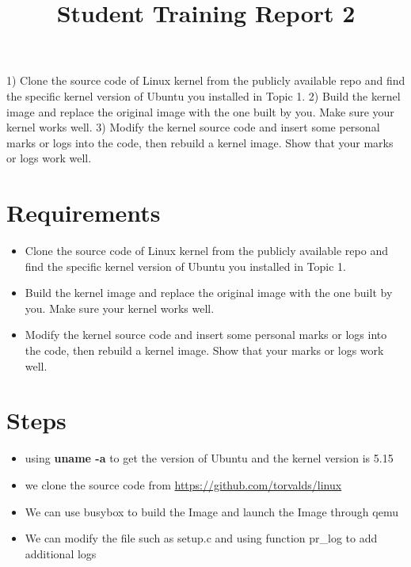 \documentclass[10pt,journal,compsoc]{IEEEtran}
\begin{document}
\title{Student Training Report 2}

\maketitle
\IEEEdisplaynontitleabstractindextext
\IEEEpeerreviewmaketitle

1) Clone the source code of Linux kernel from the publicly available repo and find the specific kernel version of Ubuntu you installed in Topic 1.
2) Build the kernel image and replace the original image with the one built by you. Make sure your kernel works well.
3) Modify the kernel source code and insert some personal marks or logs into the code, then rebuild a kernel image. Show that your marks or logs work well.

\section{Requirements}

\begin{itemize}
    \item Clone the source code of Linux kernel from the publicly available repo and find the specific kernel version of Ubuntu you installed in Topic 1.
    \item Build the kernel image and replace the original image with the one built by you. Make sure your kernel works well.
    \item Modify the kernel source code and insert some personal marks or logs into the code, then rebuild a kernel image. Show that your marks or logs work well.
\end{itemize}

\section{Steps}

\begin{itemize}
    \item using \textbf{uname -a} to get the version of Ubuntu and the kernel version is 5.15
    \item we clone the source code from \url{https://github.com/torvalds/linux}
    \item We can use busybox to build the Image and launch the Image through qemu
    \item We can modify the file such as setup.c and using function pr_log to add additional logs
\end{itemize}  
\end{document}
